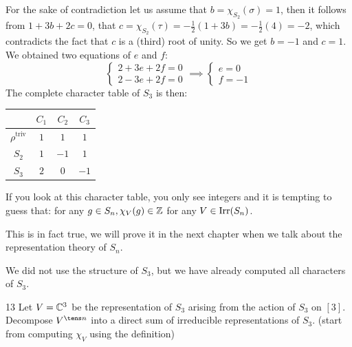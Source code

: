 \documentclass[twoside = false,	%
		headsepline,		%
		parskip = true,
		]{scrbook}						%
\begin{document}
    For the sake of contradiction let us assume that $b = \chi_{S_2}(\sigma) = 1$, then it follows from $1 + 3b + 2c = 0$, that $c = \chi_{S_2}(\tau) = -\frac{1}{2} (1 + 3b) = -\frac{1}{2} (4) = -2$, which contradicts the fact that $c$ is a (third) root of unity. So we get $b = -1$ and $c = 1$.
    We obtained two equations of $e$ and $f$:
    \begin{equation*}
        \left\{ \begin{array}{cc}
             2 + 3e + 2f = 0  \\
             2 - 3e + 2f = 0 
        \end{array}\right. \implies \left\{ \begin{array}{cc}
             e = 0  \\
             f = -1 
        \end{array}\right.
    \end{equation*}
    The complete character table of $S_3$ is then:
    \begin{table}[ht]
        \centering
        \begin{tabular}{|c|c|c|c|}
        \hline
             & $C_1$ & $C_2$ & $C_3$  \\ \hline
            $\rho^{\text{triv}}$ & $1$ & $1$ & $1$  \\ \hline
            $S_2$ & $1$ & $-1$ & $1$ \\ \hline 
            $S_3$ & $2$ & $0$ & $-1$ \\ \hline
        \end{tabular}
    \end{table}

    If you look at this character table, you only see integers and it is tempting to guess that: for any $g \in S_n, \chi_V(g) \in \mathbb Z$ for any $V \in \mathrm{Irr}(S_n)$.

    This is in fact true, we will prove it in the next chapter when we talk about the representation theory of $S_n$.

    We did not use the structure of $S_3$, but we have already computed all characters of $S_3$.

    \begin{exercise}{}{13}
        Let $V = \mathbb C^3$ be the representation of $S_3$ arising from the action of $S_3$ on $[3]$. Decompose $V^{\tens n}$ into a direct sum of irreducible representations of $S_3$. (start from computing $\chi_V$ using the definition)
    \end{exercise}
%        
\end{document}
